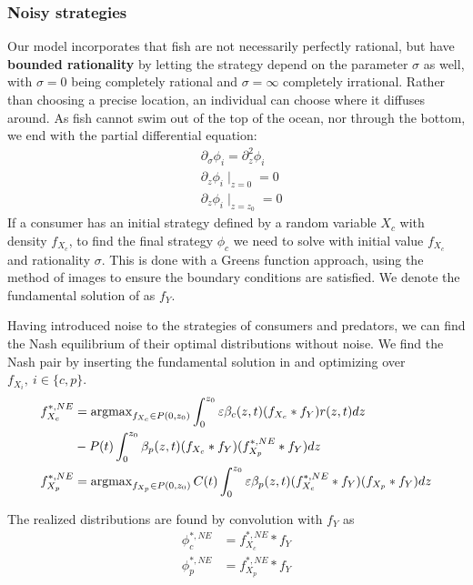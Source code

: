 \subsubsection*{Noisy strategies} %
Our model incorporates that fish are not necessarily perfectly rational, but have \textbf{bounded rationality} by letting the strategy depend on the parameter $\sigma$ as well, with $\sigma=0$ being completely rational and $\sigma = \infty$ completely irrational. Rather than choosing a precise location, an individual can choose where it diffuses around. As fish cannot swim out of the top of the ocean, nor through the bottom, we end with the partial differential equation:
\begin{align}
  \label{eq:density_PDE}
	&\partial_\sigma \phi_i = \partial_z^2 \phi_i \\
	&\partial_z \phi_i \mid_{z=0} = 0 \\
  &\partial_z \phi_i \mid_{z = z_0} = 0
\end{align}
If a consumer has an initial strategy defined by a random variable $X_c$ with density $f_{X_c}$, to find the final strategy $\phi_c$ we need to solve  with initial value $f_{X_c}$ and rationality $\sigma$. This is done with a Greens function approach, using the method of images to ensure the boundary conditions are satisfied. We denote the fundamental solution of  as $f_Y$.


Having introduced noise to the strategies of consumers and predators, we can find the Nash equilibrium of their optimal distributions without noise. We find the Nash pair by inserting the fundamental solution in  and optimizing over $f_{X_i},~i\in \{c, p\}$.
\begin{align}
	f_{X_c}^{*,NE} &=  \operatorname{argmax}_{f_{X_c} \in P(0,z_0)}  \int_0^{z_0} \varepsilon \beta_c(z,t)(f_{X_c} * f_Y) r(z,t) dz \\ & -  P(t)\int_0^{z_0} \beta_p(z,t) (f_{X_c} * f_Y)(f_{X_p}^{*,NE} * f_Y) dz \\
	f_{X_p}^{*,NE} &=  \operatorname{argmax}_{f_{X_p} \in P(0,z_0)}C(t) \int_0^{z_0} \varepsilon \beta_p(z,t)(f_{X_c}^{*,NE}  * f_Y)(f_{X_p}* f_Y) dz
\end{align}

The realized distributions are found by convolution with $f_Y$ as
\begin{align}
  \phi_c^{*,NE} &= f_{X_c}^{*,NE} * f_Y \\
  \phi_p^{*,NE} &= f_{X_p}^{*,NE} * f_Y
\end{align}

